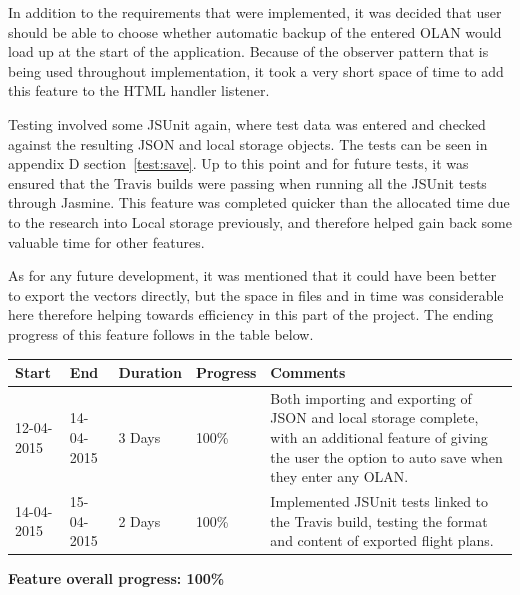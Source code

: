 In addition to the requirements that were implemented, it was decided that user should be able to choose whether automatic backup of the entered OLAN would load up at the start of the application. Because of the observer pattern that is being used throughout implementation, it took a very short space of time to add this feature to the HTML handler listener.

Testing involved some JSUnit again, where test data was entered and checked against the resulting JSON and local storage objects. The tests can be seen in appendix D section~\ref{test:save}. Up to this point and for future tests, it was ensured that the Travis builds were passing when running all the JSUnit tests through Jasmine. This feature was completed quicker than the allocated time due to the research into Local storage previously, and therefore helped gain back some valuable time for other features.

As for any future development, it was mentioned that it could have been better to export the vectors directly, but the space in files and in time was considerable here therefore helping towards efficiency in this part of the project. The ending progress of this feature follows in the table below.

\begin{table}[h]
\begin{tabular}{|l|l|l|l|p{7cm}|}
\hline
\textbf{Start} & \textbf{End} & \textbf{Duration} & \textbf{Progress} & \textbf{Comments}                                                                                                     \\ \hline
12-04-2015     & 14-04-2015   & 3 Days            & 100\%             &  Both importing and exporting of JSON and local storage complete, with an additional feature of giving the user the option to auto save when they enter any OLAN.\\ \hline
14-04-2015     & 15-04-2015   & 2 Days            & 100\%             &  Implemented JSUnit tests linked to the Travis build, testing the format and content of exported flight plans.\\ \hline
\end{tabular}
\end{table}

\textbf{Feature overall progress: 100\%}

